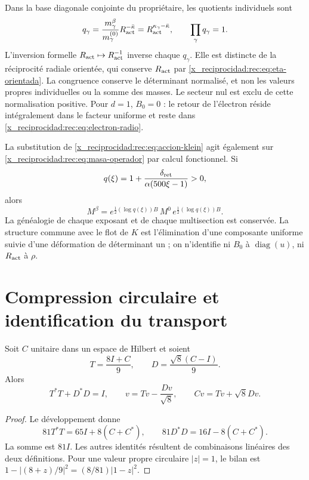 Dans la base diagonale conjointe du propriétaire, les quotients individuels sont
\[
 q_\gamma=\frac{m_\gamma^\beta}{m_\gamma^{(0)}}R_{\rm act}^{-\bar\kappa}
 =R_{\rm act}^{\kappa_\gamma-\bar\kappa},\qquad
 \prod_\gamma q_\gamma=1.
\]
L’inversion formelle \(R_{\rm act}\mapsto R_{\rm act}^{-1}\) inverse chaque \(q_\gamma\). Elle est distincte de la réciprocité radiale orientée, qui conserve \(R_{\rm act}\) par \eqref{x_reciprocidad:rec:eq:eta-orientada}. La congruence conserve le déterminant normalisé, et non les valeurs propres individuelles ou la somme des masses. Le secteur nul est exclu de cette normalisation positive. Pour \(d=1\), \(B_0=0\) : le retour de l’électron réside intégralement dans le facteur uniforme et reste dans \eqref{x_reciprocidad:rec:eq:electron-radio}.

La substitution de \eqref{x_reciprocidad:rec:eq:accion-klein} agit également sur \eqref{x_reciprocidad:rec:eq:masa-operador} par calcul fonctionnel. Si
\[
 q(\xi)=1+\frac{\delta_{\rm ret}}{\alpha(500\xi-1)}>0,
\]
alors
\[
 M^\beta=e^{\frac12(\log q(\xi))B}\,M^0\,
          e^{\frac12(\log q(\xi))B}.
\]
La généalogie de chaque exposant et de chaque multisection est conservée. La structure commune avec le flot de \(K\) est l’élimination d’une composante uniforme suivie d’une déformation de déterminant un ; on n’identifie ni \(B_0\) à \(\operatorname{diag}(u)\), ni \(R_{\rm act}\) à \(\rho\).

\section{Compression circulaire et identification du transport}

\begin{theorem}
\label{x_reciprocidad:rec:thm:operador}
Soit \(C\) unitaire dans un espace de Hilbert et soient
\[
 T=\frac{8I+C}{9},\qquad D=\frac{\sqrt8(C-I)}9.
\]
Alors
\begin{equation}
 T^*T+D^*D=I,\qquad
 v=Tv-\frac{Dv}{\sqrt8},\qquad Cv=Tv+\sqrt8Dv.
 \label{x_reciprocidad:rec:eq:unitario}
\end{equation}
\end{theorem}
\begin{proof}
Le développement donne
\[
 81T^*T=65I+8(C+C^*),\qquad
 81D^*D=16I-8(C+C^*).
\]
La somme est \(81I\). Les autres identités résultent de combinaisons linéaires des deux définitions. Pour une valeur propre circulaire \(|z|=1\), le bilan est \(1-|(8+z)/9|^2=(8/81)|1-z|^2\).
\end{proof}

